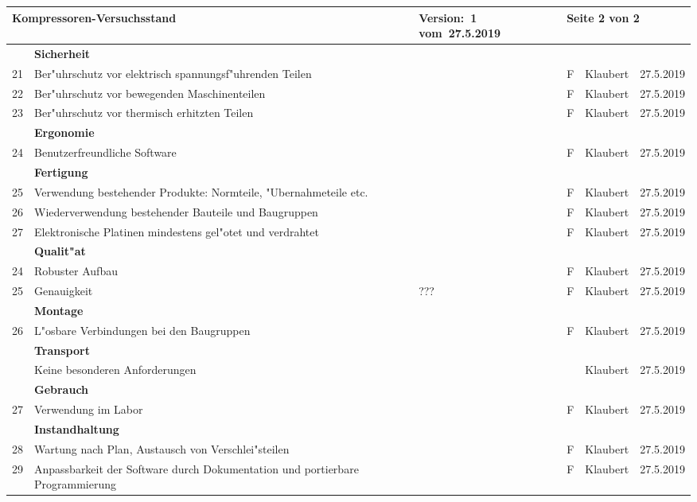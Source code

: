 \begin{center}
 \begin{tabular}{|l|p{5cm}|p{3cm}|l|l|l|}
 \hline
 \multicolumn{2}{|l|}{\textbf{Kompressoren-Versuchsstand}}
&  Version:~1   vom~27.5.2019
 & \multicolumn{3}{|l|}{Seite 2 von 2} \\
  \hline
  & \textbf{Sicherheit} & & & & \\
 21 & Ber"uhrschutz vor elektrisch spannungsf"uhrenden Teilen
   & & F & Klaubert & 27.5.2019 \\
 22 & Ber"uhrschutz vor bewegenden Maschinenteilen
   & & F & Klaubert & 27.5.2019 \\
 23 &  Ber"uhrschutz vor thermisch erhitzten Teilen
 & & F & Klaubert & 27.5.2019 \\
 \hline
  & \textbf{Ergonomie} & & & & \\
 24 & Benutzerfreundliche Software & & F
    & Klaubert & 27.5.2019 \\
 \hline
     & \textbf{Fertigung} & & & & \\
 25  & Verwendung bestehender Produkte: Normteile,
 "Ubernahmeteile etc.& & F & Klaubert & 27.5.2019 \\
 26  & Wiederverwendung bestehender Bauteile und Baugruppen
 & & F & Klaubert & 27.5.2019 \\
 27 & Elektronische Platinen mindestens gel"otet und verdrahtet
 & & F & Klaubert & 27.5.2019 \\
     \hline
     & \textbf{Qualit"at} & & & & \\
 24 & Robuster Aufbau & &  F & Klaubert & 27.5.2019 \\
 25 & Genauigkeit & ??? &  F & Klaubert & 27.5.2019 \\
      \hline
     & \textbf{Montage} & & & & \\
 26 & L"osbare Verbindungen bei den Baugruppen
  & & F & Klaubert & 27.5.2019 \\
 \hline
 & \textbf{Transport} & & & & \\
   & Keine besonderen Anforderungen & & & Klaubert & 27.5.2019 \\
      & \textbf{Gebrauch} & & & & \\
 27 & Verwendung im Labor &  & F
    & Klaubert & 27.5.2019\\
 \hline
& \textbf{Instandhaltung} & & & & \\
 28 & Wartung nach Plan, Austausch von Verschlei"steilen
    & & F & Klaubert & 27.5.2019\\
 29 & Anpassbarkeit der Software durch Dokumentation und portierbare
    Programmierung
    & & F & Klaubert & 27.5.2019\\

\end{tabular}
\end{center}
